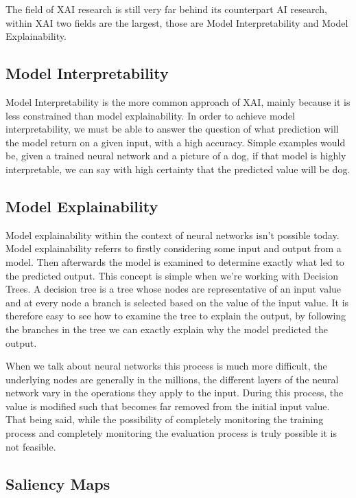 The field of XAI research is still very far behind its counterpart AI research, within XAI two fields are the largest, those are Model Interpretability and Model Explainability.

\subsection{Model Interpretability}

Model Interpretability is the more common approach of XAI, mainly because it is less constrained than model explainability. In order to achieve model interpretability, we must be able to answer the question of what prediction will the model return on a given input, with a high accuracy. Simple examples would be, given a trained neural network and a picture of a dog, if that model is highly interpretable, we can say with high certainty that the predicted value will be dog.

\subsection{Model Explainability}

Model explainability within the context of neural networks isn't possible today. Model
explainability referrs to firstly considering some input and output from a model. Then
afterwards the model is examined to determine exactly what led to the predicted output.
This concept is simple when we're working with Decision Trees. A decision tree is a tree
whose nodes are representative of an input value and at every node a branch is selected
based on the value of the input value. It is therefore easy to see how to examine the tree
to explain the output, by following the branches in the tree we can exactly explain why the model predicted the output.

When we talk about neural networks this process is much more difficult, the underlying nodes
are generally in the millions, the different layers of the neural network vary in the operations they apply to the input. During this process, the value is modified such that becomes far removed from the initial input value. That being said, while the possibility of completely monitoring the training process and completely monitoring the evaluation process is truly possible it is not feasible.


\subsection{Saliency Maps}

